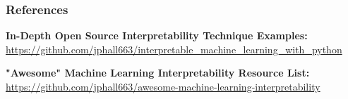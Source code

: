 \documentclass[11pt,
               aspectratio=169,
               hyperref={colorlinks}
               ]{beamer}
\begin{document}

	\begin{frame}[t, allowframebreaks]
	
		\frametitle{References}	
		
			\textbf{In-Depth Open Source Interpretability Technique Examples:}\\
			\small{\url{https://github.com/jphall663/interpretable_machine_learning_with_python}}
			
			\vspace{10pt}
			
			\textbf{"Awesome" Machine Learning Interpretability Resource List:}\\
			\small{\url{https://github.com/jphall663/awesome-machine-learning-interpretability}}
			
		
		\framebreak		
		
		\printbibliography
		
	\end{frame}
\end{document}
